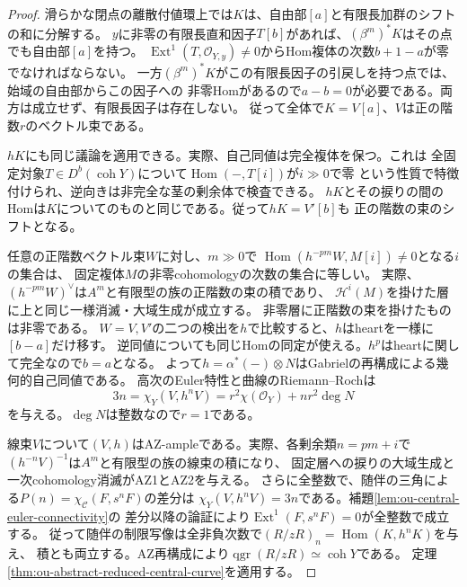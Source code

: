 \documentclass[11pt,a4paper]{ltjsarticle}
\theoremstyle{definition}
\newcommand{\qgr}{\operatorname{qgr}}
\newcommand{\coh}{\operatorname{coh}}
\begin{document}
\begin{proof}
滑らかな閉点の離散付値環上では$K$は、自由部$[a]$と有限長加群のシフトの和に分解する。
$y$に非零の有限長直和因子$T[b]$があれば、$(\beta^m)^*K$はその点でも自由部$[a]$を持つ。
$\operatorname{Ext}^1(T,\mathcal O_{Y,y})\ne0$からHom複体の次数$b+1-a$が零でなければならない。
一方$(\beta^m)^*K$がこの有限長因子の引戻しを持つ点では、始域の自由部からこの因子への
非零Homがあるので$a-b=0$が必要である。両方は成立せず、有限長因子は存在しない。
従って全体で$K=V[a]$、$V$は正の階数$r$のベクトル束である。

$hK$にも同じ議論を適用できる。実際、自己同値は完全複体を保つ。これは
全固定対象$T\in D^b(\coh Y)$について$\operatorname{Hom}(-,T[i])$が$i\gg0$で零
という性質で特徴付けられ、逆向きは非完全な茎の剰余体で検査できる。
$hK$とその捩りの間のHomは$K$についてのものと同じである。従って$hK=V'[b]$も
正の階数の束のシフトとなる。

任意の正階数ベクトル束$W$に対し、$m\gg0$で
$\operatorname{Hom}(h^{-pm}W,M[i])\ne0$となる$i$の集合は、
固定複体$M$の非零cohomologyの次数の集合に等しい。
実際、$(h^{-pm}W)^\vee$は$A^m$と有限型の族の正階数の束の積であり、
$\mathcal H^i(M)$を掛けた層に上と同じ一様消滅・大域生成が成立する。
非零層に正階数の束を掛けたものは非零である。
$W=V,V'$の二つの検出を$h$で比較すると、$h$はheartを一様に$[b-a]$だけ移す。
逆同値についても同じHomの同定が使える。$h^p$はheartに関して完全なので$b=a$となる。
よって$h=\alpha^*(-)\otimes N$はGabrielの再構成による幾何的自己同値である。
高次のEuler特性と曲線のRiemann--Rochは
\[
 3n=\chi_Y(V,h^nV)=r^2\chi(\mathcal O_Y)+nr^2\deg N
\]
を与える。$\deg N$は整数なので$r=1$である。

線束$V$について$(V,h)$はAZ-ampleである。実際、各剰余類$n=pm+i$で
$(h^{-n}V)^{-1}$は$A^m$と有限型の族の線束の積になり、
固定層への捩りの大域生成と一次cohomology消滅がAZ1とAZ2を与える。
さらに全整数で、随伴の三角による$P(n)=\chi_{\mathcal C}(F,s^nF)$の差分は
$\chi_Y(V,h^nV)=3n$である。補題\ref{lem:ou-central-euler-connectivity}の
差分以降の論証により$\operatorname{Ext}^1(F,s^n F)=0$が全整数で成立する。
従って随伴の制限写像は全非負次数で$(R/zR)_n=\operatorname{Hom}(K,h^nK)$を与え、
積とも両立する。AZ再構成により$\qgr(R/zR)\simeq\coh Y$である。
定理\ref{thm:ou-abstract-reduced-central-curve}を適用する。
\end{proof}
\end{document}

